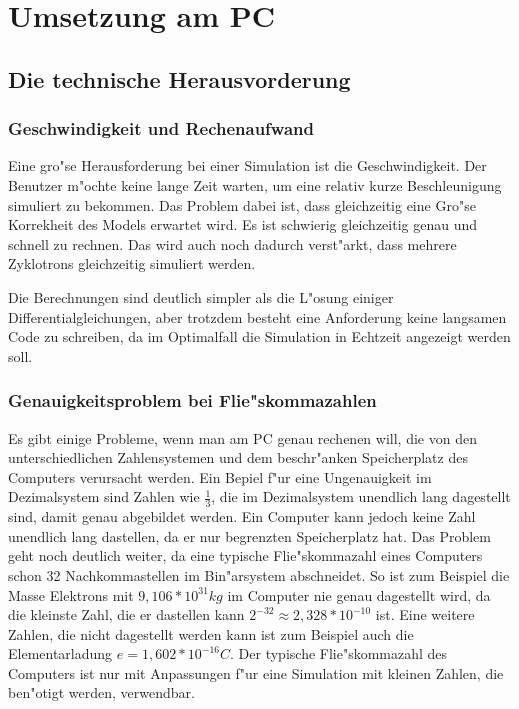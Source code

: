 \documentclass[14pt, a4paper]{report}
\begin{document}
\part{Umsetzung am PC}
\chapter{Die technische Herausvorderung}
\section{Geschwindigkeit und Rechenaufwand}
Eine gro"se Herausforderung bei einer Simulation ist die Geschwindigkeit. Der Benutzer
m"ochte keine lange Zeit warten, um eine relativ kurze Beschleunigung simuliert zu
bekommen. Das Problem dabei ist, dass gleichzeitig eine Gro"se Korrekheit des Models
erwartet wird. Es ist schwierig gleichzeitig genau und schnell zu rechnen. Das wird 
auch noch dadurch verst"arkt, dass mehrere Zyklotrons gleichzeitig simuliert werden.

Die Berechnungen sind deutlich simpler als die L"osung einiger Differentialgleichungen,
aber trotzdem besteht eine Anforderung keine langsamen Code zu schreiben, da im 
Optimalfall die Simulation in Echtzeit angezeigt werden soll.


\section{Genauigkeitsproblem bei Flie"skommazahlen}
Es gibt einige Probleme, wenn man am PC genau rechenen will, die von den 
unterschiedlichen Zahlensystemen und dem beschr"anken Speicherplatz des Computers 
verursacht werden. Ein Bepiel f"ur eine Ungenauigkeit im Dezimalsystem sind Zahlen
wie $\frac{1}{3}$, die im Dezimalsystem unendlich lang dagestellt sind, damit genau
abgebildet werden. Ein Computer kann jedoch keine Zahl unendlich lang dastellen, da
er nur begrenzten Speicherplatz hat. Das Problem geht noch deutlich weiter, da eine
typische Flie"skommazahl eines Computers schon 32 Nachkommastellen im 
Bin"arsystem abschneidet. So ist zum Beispiel die Masse Elektrons mit $9,106 * 10^{31} 
kg$ im Computer nie genau dagestellt wird, da die kleinste Zahl, die er dastellen kann 
$2^{-32} \approx 2,328 * 10^{-10}$ ist. Eine weitere Zahlen, die nicht dagestellt werden
kann ist zum Beispiel auch die Elementarladung $e = 1,602 * 10^{-16} C$. Der typische 
Flie"skommazahl des Computers ist nur mit Anpassungen f"ur eine Simulation mit kleinen
Zahlen, die ben"otigt werden, verwendbar.
\end{document}
